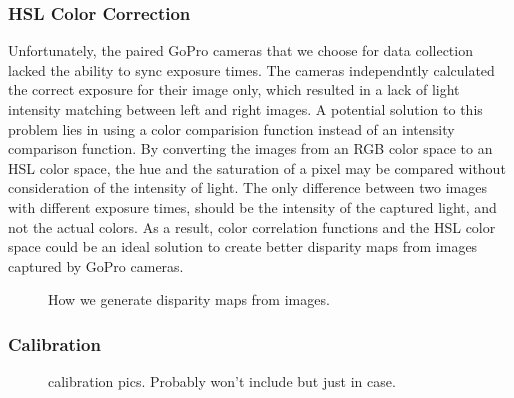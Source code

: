 \documentclass[a4paper,twoside]{article}
\begin{document}
\subsubsection{HSL Color Correction}
\label{subsec:calibration}
Unfortunately, the paired GoPro cameras that we choose for data collection lacked the ability to sync exposure times.  
The cameras independntly calculated the correct exposure for their image only, which resulted in a lack of light intensity matching between left and right images.
A potential solution to this problem lies in using a color comparision function instead of an intensity comparison function.  By converting the images from an RGB color space to an HSL color space, the hue and the saturation of a pixel may be compared without consideration of the intensity of light.  
The only difference between two images with different exposure times, should be the intensity of the captured light, and not the actual colors.  
As a result, color correlation functions and the HSL color space could be an ideal solution to create better disparity maps from images captured by GoPro cameras.
  

\noindent

\begin{figure*}[!ht]
   \vspace{-0.2cm}
   \caption{How we generate disparity maps from images.}
  \label{fig:dispgen}
 \end{figure*}

\subsubsection{Calibration}
\label{subsec:calibration}


\begin{figure}[!h]
	\centering
		\quad %
		\caption{calibration pics. Probably won't include but just in case.}
		\label{calibrate}
\end{figure}
\end{document}
